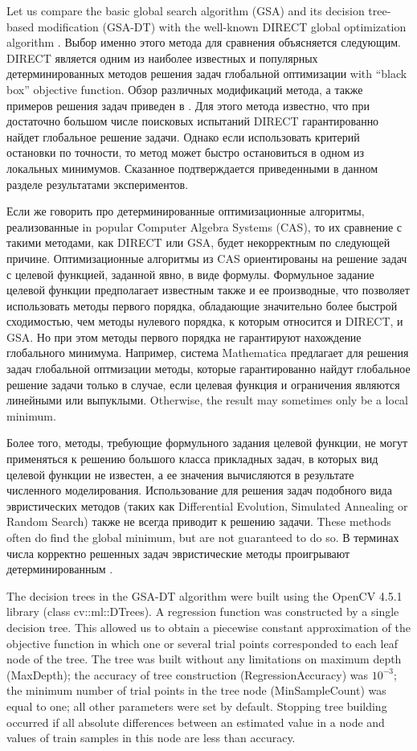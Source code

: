 \documentclass[entropy,article,submit,moreauthors,pdftex]{Definitions/mdpi}
\begin{document}
Let us compare the basic global search algorithm (GSA) and its decision tree-based modification (GSA-DT) with the well-known DIRECT global optimization algorithm  \cite{Jones2009}.
Выбор именно этого метода для сравнения объясняется следующим. DIRECT является одним из наиболее известных и популярных детерминированных методов решения задач глобальной оптимизации with ``black box'' objective function. Обзор различных модификаций метода, а также примеров решения задач приведен в \cite{Jones2021}.
Для этого метода известно, что при достаточно большом числе поисковых испытаний DIRECT гарантированно найдет глобальное решение задачи.  
Однако если использовать критерий остановки по точности, то метод может быстро остановиться в одном из локальных минимумов. Сказанное подтверждается приведенными в данном разделе результатами экспериментов. 

Если же говорить про детерминированные оптимизационные алгоритмы, реализованные in popular Computer Algebra Systems (CAS), то их сравнение с такими методами, как DIRECT или GSA, будет некорректным по следующей причине.
Оптимизационные алгоритмы из CAS ориентированы на решение задач с целевой функцией, заданной явно, в виде формулы.
Формульное задание целевой функции предполагает известным также и ее производные, что позволяет использовать методы первого порядка, обладающие значительно более быстрой сходимостью, чем методы нулевого порядка, к которым относится и DIRECT, и GSA. Но при этом методы первого порядка не гарантируют нахождение глобального минимума. 
Например, система Mathematica предлагает для решения задач глобальной оптмизации методы, которые гарантированно найдут глобальное решение задачи только в случае, если целевая функция и ограничения являются линейными или выпуклыми. Otherwise, the result may sometimes only be a local minimum.

Более того, методы, требующие формульного задания целевой функции, не могут применяться к решению большого класса прикладных задач, в которых вид целевой функции не известен, а ее значения вычисляются в результате численного моделирования. Использование для решения задач подобного вида эвристических методов (таких как Differential Evolution, Simulated Annealing or Random Search) также не всегда приводит к решению задачи. 
These methods often do find the global minimum, but are not guaranteed to do so. В терминах числа корректно решенных задач эвристические методы проигрывают детерминированным \cite{Sergeyev2018}.


The decision trees in the GSA-DT algorithm were built using the OpenCV 4.5.1 library (class cv::ml::DTrees). A regression function was constructed by a single decision tree. This allowed us to obtain a piecewise constant approximation of the objective function in which one or several trial points corresponded to each leaf node of the tree. 
The tree was built without any limitations on maximum depth (MaxDepth); the accuracy of tree construction (RegressionAccuracy) was $10^{-3}$; the minimum number of trial points in the tree node (MinSampleCount) was equal to one; all other parameters were set by default. Stopping tree building occurred if all absolute differences between an estimated value in a node and values of train samples in this node are less than accuracy.
\end{document}
